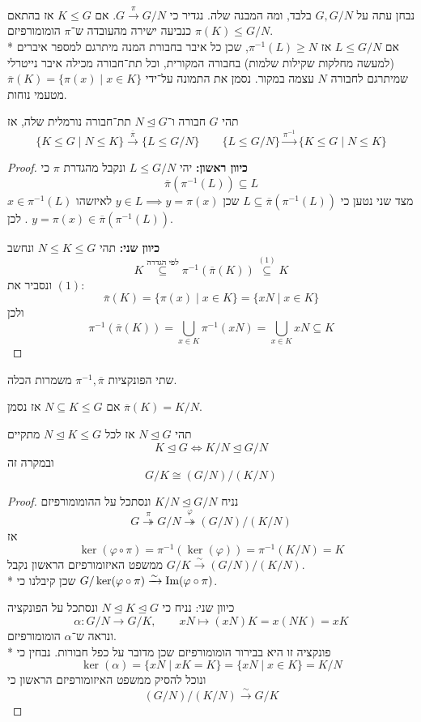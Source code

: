 נבחן עתה על $G, G/N$ בלבד, ומה המבנה שלה. נגדיר כי $G \xrightarrow{\pi} G/N$. אם $K \le G$ אז בהתאם $\pi(K) \le G/N$ כנביעה ישירה מהעובדה ש־$\pi$ הומומורפיזם. \\*
אם $L \le G/N$ אז $\pi^{-1}(L) \ge N$, שכן כל איבר בחבורת המנה מיתרגם למספר איברים (למעשה מחלקות שקילות שלמות) בחבורה המקורית, וכל תת־חבורה מכילה איבר נייטרלי שמיתרגם לחבורה $N$ עצמה במקור.
נסמן את התמונה על־ידי $\overline{\pi}(K) = \{ \pi(x) \mid x \in K\}$ מטעמי נוחות.
\begin{theorem}
	תהי $G$ חבורה ו־$N \trianglelefteq G$ תת־חבורה נורמלית שלה, אז
	\[
		\{ K \le G \mid N \le K \} \xrightarrow{\overline{\pi}} \{ L \le G/N \}
		\qquad
		\{ L \le G/N \} \xrightarrow{\pi^{-1}} \{ K \le G \mid N \le K \} 
	\]
\end{theorem}
\begin{proof}
	\textbf{כיוון ראשון:}
	יהי $L \le G/N$ ונקבל מהגדרת $\pi$ כי
	\[
		\overline{\pi}(\pi^{-1}(L)) \subseteq L
	\]
	מצד שני נטען כי $L \subseteq \overline{\pi}(\pi^{-1}(L))$ שכן $y \in L \implies y = \pi(x)$ לאיזשהו $x \in \pi^{-1}(L)$.
	לכן $y = \pi(x) \in \overline{\pi}(\pi^{-1}(L))$.

	\textbf{כיוון שני:}
	תהי $N \le K \le G$ ונחשב
	\[
		K \overset{\text{לפי הגדרה}}{\subseteq} \pi^{-1}(\overline{\pi}(K)) \overset{(1)}{\subseteq} K
	\]
	ונסביר את $(1)$:
	\[
		\overline{\pi}(K) = \{ \pi(x) \mid x \in K \} = \{ xN \mid x \in K \}
	\]
	ולכן
	\[
		\pi^{-1}(\overline{\pi}(K)) = \bigcup_{x \in K} \pi^{-1}(x N) = \bigcup_{x \in K} x N \subseteq K
	\]
\end{proof}
\begin{remark}
	שתי הפונקציות $\pi^{-1}, \overline{\pi}$ משמרות הכלה.
\end{remark}
\begin{notation}
	אם $N \subseteq K \le G$ אז נסמן $\overline{\pi}(K) = K / N$.
\end{notation}
\begin{theorem}
	תהי $N \trianglelefteq G$ אז לכל $N \trianglelefteq K \le G$ מתקיים
	\[
		K \trianglelefteq G \iff K/N \trianglelefteq G/N
	\]
	ובמקרה זה
	\[
		G/K \cong (G/N)/(K/N)
	\]
\end{theorem}
\begin{proof}
	נניח $K/N \trianglelefteq G/N$ ונסתכל על ההומומורפיזם
	\[
		G \overset{\pi}{\twoheadrightarrow} G/N \overset{\varphi}{\twoheadrightarrow} (G/N)/(K/N)
	\]
	אז
	\[
		\ker(\varphi \circ \pi) = \pi^{-1}(\ker(\varphi)) = \pi^{-1}(K/N) = K
	\]
	ממשפט האיזומורפיזם הראשון נקבל $G/K \xrightarrow{\sim} (G/N)/(K/N)$. \\*
	שכן קיבלנו כי $G/\ker(\varphi \circ \pi) \xrightarrow{\sim} \operatorname{Im}(\varphi \circ \pi)$.

	כיוון שני:
	נניח כי $N \trianglelefteq K \trianglelefteq G$ ונסתכל על הפונקציה
	\[
		\alpha : G/N \to G/K,
		\qquad
		xN \mapsto (xN)K = x(NK) = xK
	\]
	ונראה ש־$\alpha$ הומומורפיזם. \\*
	פונקציה זו היא בבירור הומומורפיזם שכן מדובר על כפל חבורות.
	נבחין כי
	\[
		\ker(\alpha) = \{ xN \mid xK = K \}
		= \{ xN \mid x \in K \}
		= K/N
	\]
	ונוכל להסיק ממשפט האיזומורפיזם הראשון כי
	\[
		(G/N)/(K/N) \xrightarrow{\sim} G/K
	\]
\end{proof}
